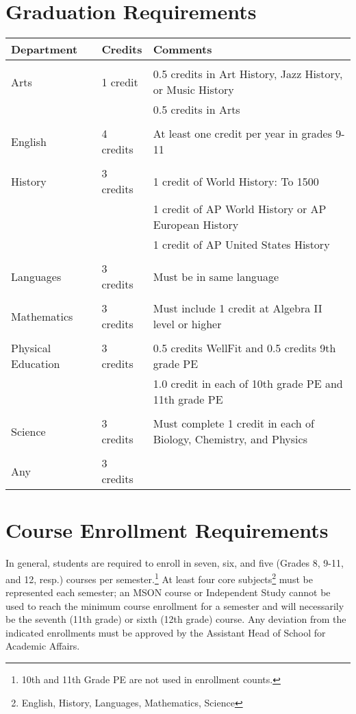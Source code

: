 \etc

\vfill


\section{Graduation Requirements}

\begin{tabular}{lll}
  Department & Credits & Comments\\
  \hline  \hline\\
  Arts & 1 credit& 0.5 credits in Art History, Jazz History, or Music History\\
   & & 0.5 credits in Arts\\  
   \\
  English &  4 credits& At least one credit per year in grades 9-11  \\
  \\
  History      &  3 credits&  1 credit of World History:  To 1500\\
              &  &  1 credit of AP World History or AP European History\\  
              &  &  1 credit of AP United States History\\       
   \\                              
  Languages  &  3 credits& Must be in same language  \\
  \\
  Mathematics   &  3 credits& Must include 1 credit at Algebra II level or higher  \\
  \\
  Physical Education   &  3 credits& 0.5 credits WellFit and 0.5 credits 9th grade PE\\
&&  1.0 credit in each of 10th grade PE and 11th grade PE  \\
\\
  Science                    &  3 credits & Must complete 1 credit in each of Biology, Chemistry, and Physics \\
  \\
  Any                        &  3 credits\\
\end{tabular}


\section{Course Enrollment Requirements}

In general, students are required to enroll in seven, six, and five (Grades 8, 9-11, and 12, resp.) courses per semester.\footnote{10th and 11th Grade PE are not used in enrollment counts.}  At least four core subjects\footnote{English, History, Languages, Mathematics, Science}  must be represented each semester; an MSON course or Independent Study cannot be used to reach the minimum course enrollment for a semester and will necessarily be the seventh (11th grade) or sixth (12th grade) course.  Any deviation from the indicated enrollments must be approved by the Assistant Head of School for Academic Affairs.

